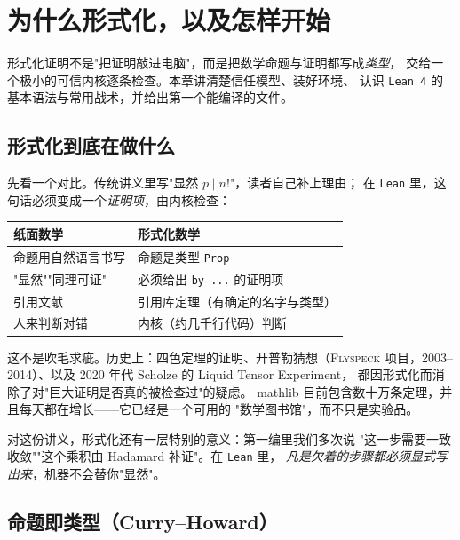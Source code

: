 \chapter{为什么形式化，以及怎样开始}
\label{chap:lean-intro}

\begin{keybox}[本章要点]
形式化证明不是"把证明敲进电脑"，而是把数学命题与证明都写成\emph{类型}，
交给一个极小的可信内核逐条检查。本章讲清楚信任模型、装好环境、
认识 \texttt{Lean 4} 的基本语法与常用战术，并给出第一个能编译的文件。
\end{keybox}

\section{形式化到底在做什么}
\label{sec:06-why}

先看一个对比。传统讲义里写"显然 $p\mid n!$"，读者自己补上理由；
在 \texttt{Lean} 里，这句话必须变成一个\emph{证明项}，由内核检查：
\begin{center}
\begin{tabular}{@{}p{}p{}@{}}
\toprule
\textbf{纸面数学} & \textbf{形式化数学}\\
\midrule
命题用自然语言书写 & 命题是类型 \texttt{Prop}\\
"显然""同理可证" & 必须给出 \texttt{by ...} 的证明项\\
引用文献 & 引用库定理（有确定的名字与类型）\\
人来判断对错 & 内核（约几千行代码）判断\\
\bottomrule
\end{tabular}
\end{center}

这不是吹毛求疵。历史上：四色定理的证明、开普勒猜想（\textsc{Flyspeck}
项目，2003--2014）、以及 2020 年代 Scholze 的 Liquid Tensor Experiment，
都因形式化而消除了对"巨大证明是否真的被检查过"的疑虑。
mathlib 目前包含数十万条定理，并且每天都在增长——它已经是一个可用的
"数学图书馆"，而不只是实验品\cite{mathlib4,mil2023}。

对这份讲义，形式化还有一层特别的意义：第一编里我们多次说
"这一步需要一致收敛""这个乘积由 Hadamard 补证"。在 \texttt{Lean} 里，
\emph{凡是欠着的步骤都必须显式写出来}，机器不会替你"显然"。

\section{命题即类型（Curry--Howard）}
\label{sec:06-curryhoward}


